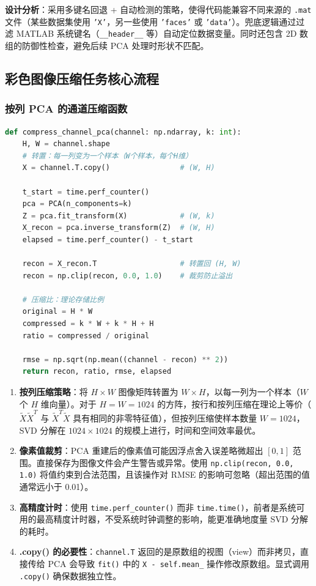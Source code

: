 \documentclass[a4paper]{article}
\begin{document}
\textbf{设计分析}：采用多键名回退 + 自动检测的策略，使得代码能兼容不同来源的 \texttt{.mat} 文件（某些数据集使用 \texttt{'X'}，另一些使用 \texttt{'faces'} 或 \texttt{'data'}）。兜底逻辑通过过滤 MATLAB 系统键名（\texttt{\_\_header\_\_} 等）自动定位数据变量。同时还包含 2D 数组的防御性检查，避免后续 PCA 处理时形状不匹配。

\subsection{彩色图像压缩任务核心流程}

\subsubsection{按列 PCA 的通道压缩函数}

\begin{lstlisting}[language=Python, caption=rgb_task.py——单通道PCA压缩与重建]
def compress_channel_pca(channel: np.ndarray, k: int):
    H, W = channel.shape
    # 转置：每一列变为一个样本（W个样本，每个H维）
    X = channel.T.copy()                # (W, H)

    t_start = time.perf_counter()
    pca = PCA(n_components=k)
    Z = pca.fit_transform(X)            # (W, k)
    X_recon = pca.inverse_transform(Z)  # (W, H)
    elapsed = time.perf_counter() - t_start

    recon = X_recon.T                   # 转置回 (H, W)
    recon = np.clip(recon, 0.0, 1.0)    # 裁剪防止溢出

    # 压缩比：理论存储比例
    original = H * W
    compressed = k * W + k * H + H
    ratio = compressed / original

    rmse = np.sqrt(np.mean((channel - recon) ** 2))
    return recon, ratio, rmse, elapsed
\end{lstlisting}

\begin{enumerate}
    \item \textbf{按列压缩策略}：将 $H \times W$ 图像矩阵转置为 $W \times H$，以每一列为一个样本（$W$ 个 $H$ 维向量）。对于 $H=W=1024$ 的方阵，按行和按列压缩在理论上等价（$\tilde{X}\tilde{X}^T$ 与 $\tilde{X}^T\tilde{X}$ 具有相同的非零特征值），但按列压缩使样本数量 $W=1024$，SVD 分解在 $1024 \times 1024$ 的规模上进行，时间和空间效率最优。

    \item \textbf{像素值裁剪}：PCA 重建后的像素值可能因浮点舍入误差略微超出 $[0, 1]$ 范围。直接保存为图像文件会产生警告或异常。使用 \texttt{np.clip(recon, 0.0, 1.0)} 将值约束到合法范围，且该操作对 RMSE 的影响可忽略（超出范围的值通常远小于 0.01）。

    \item \textbf{高精度计时}：使用 \texttt{time.perf\_counter()} 而非 \texttt{time.time()}，前者是系统可用的最高精度计时器，不受系统时钟调整的影响，能更准确地度量 SVD 分解的耗时。

    \item \textbf{.copy() 的必要性}：\texttt{channel.T} 返回的是原数组的视图（view）而非拷贝，直接传给 PCA 会导致 \texttt{fit()} 中的 \texttt{X - self.mean\_} 操作修改原数组。显式调用 \texttt{.copy()} 确保数据独立性。
\end{enumerate}
\end{document}
